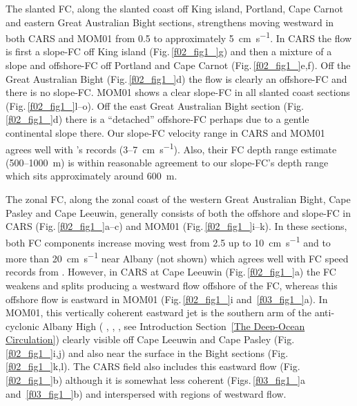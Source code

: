 \documentclass[preprint,3p,review,12pt]{elsarticle}
\newcommand{\citepos}[1]{\citeauthor{#1}'s \citeyearpar{#1}}
\begin{document}
The slanted FC, along the slanted coast off King island, Portland, Cape Carnot and eastern Great Australian Bight sections, strengthens moving westward in both CARS and MOM01 from \num{0.5} to approximately \SI{5}{\centi\meter\per\second}. In CARS the flow is first a slope-FC off King island (Fig.\,\ref{f02_fig1_}g) and then a mixture of a slope and offshore-FC off Portland and Cape Carnot (Fig.\,\ref{f02_fig1_}e,f). Off the Great Australian Bight (Fig.\,\ref{f02_fig1_}d) the flow is clearly an offshore-FC and there is no slope-FC\@.
MOM01 shows a clear slope-FC in all slanted coast sections (Fig.\,\ref{f02_fig1_}l--o).
Off the east Great Australian Bight section (Fig.\,\ref{f02_fig1_}d) there is a ``detached'' offshore-FC perhaps due to a gentle continental slope there.
Our slope-FC velocity range in CARS and MOM01 agrees well with \citepos{Middleton2007} records (\num{3}--\SI{7}{\centi\meter\per\second}). Also, their FC depth range estimate (\num{500}--\SI{1000}{\meter}) is within reasonable agreement to our slope-FC's depth range which sits approximately around \SI{600}{\meter}.

The zonal FC, along the zonal coast of the western Great Australian Bight, Cape Pasley and Cape Leeuwin, generally consists of both the offshore and slope-FC in CARS (Fig.\,\ref{f02_fig1_}a--c) and MOM01 (Fig.\,\ref{f02_fig1_}i--k). In these sections, both FC components increase moving west from \num{2.5} up to \SI{10}{\centi\meter\per\second} and to more than \SI{20}{\centi\meter\per\second} near Albany (not shown) which agrees well with FC speed records from \citet{Cresswell1993}. However, in CARS at Cape Leeuwin (Fig.\,\ref{f02_fig1_}a) the FC weakens and splits producing a westward flow offshore of the FC, whereas this offshore flow is eastward in MOM01 (Fig.\,\ref{f02_fig1_}i and~\ref{f03_fig1_}a).
In MOM01, this vertically coherent eastward jet is the southern arm of the anti-cyclonic Albany High (\citeauthor{Middleton2003} \citeyear{Middleton2003}, \citeauthor{Middleton2007} \citeyear{Middleton2007}, \citeauthor{McCartney2007} \citeyear{McCartney2007}, see Introduction Section~\ref{The Deep-Ocean Circulation}) clearly visible off Cape Leeuwin and Cape Pasley (Fig.\,\ref{f02_fig1_}i,j) and also near the surface in the Bight sections (Fig.\,\ref{f02_fig1_}k,l).
The CARS field also includes this eastward flow (Fig.\,\ref{f02_fig1_}b) although it is somewhat less coherent (Figs.\,\ref{f03_fig1_}a and~\ref{f03_fig1_}b) and interspersed with regions of westward flow.
\end{document}
